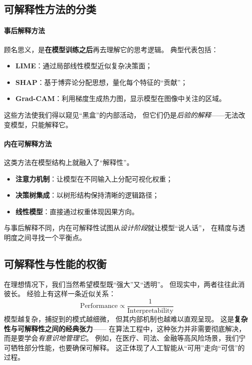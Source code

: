 \subsection{可解释性方法的分类}

\paragraph{事后解释方法}  
顾名思义，是\textbf{在模型训练之后}再去理解它的思考逻辑。  
典型代表包括：  
\begin{itemize}
\item \textbf{LIME}：通过局部线性模型近似复杂决策面；  
\item \textbf{SHAP}：基于博弈论分配思想，量化每个特征的“贡献”；  
\item \textbf{Grad-CAM}：利用梯度生成热力图，显示模型在图像中关注的区域。  
\end{itemize}
这些方法使我们得以窥见“黑盒”的内部活动，  
但它们仍是\textit{后验的解释}——无法改变模型，只能解释它。

\paragraph{内在可解释方法}  
这类方法在模型结构上就融入了“解释性”。  
\begin{itemize}
\item \textbf{注意力机制}：让模型在不同输入上分配可视化权重；  
\item \textbf{决策树集成}：以树形结构保持清晰的逻辑路径；  
\item \textbf{线性模型}：直接通过权重体现因果方向。  
\end{itemize}
与事后解释不同，内在可解释性试图从\textit{设计阶段}就让模型“说人话”，  
在精度与透明度之间寻找一个平衡点。

\subsection{可解释性与性能的权衡}

在理想情况下，我们当然希望模型既“强大”又“透明”。  
但现实中，两者往往此消彼长。  
经验上有这样一条近似关系：  
$$\text{Performance} \propto \frac{1}{\text{Interpretability}}$$  
模型越复杂，捕捉到的模式越细微，  
但其内部机制也越难以直观呈现。  
这是\textbf{复杂性与可解释性之间的经典张力}——  
在算法工程中，这种张力并非需要彻底解决，而是要学会\textit{有意识地管理它}。  
例如，在医疗、司法、金融等高风险场景，我们宁可牺牲部分性能，也要确保可解释。  
这正体现了人工智能从“可用”走向“可信”的过程。

